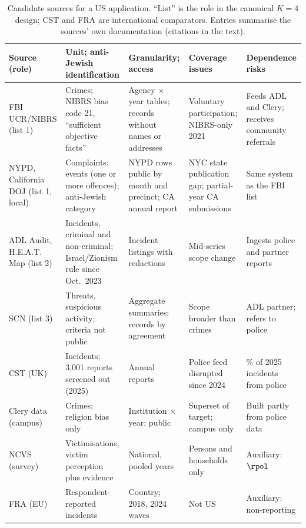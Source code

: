 \begin{table}[tbp]
\centering
\caption{Candidate sources for a US application. ``List'' is the role in the canonical $K=4$ design; CST and FRA are international comparators. Entries summarise the sources' own documentation (citations in the text).}\label{tab:src-compare}
\footnotesize
\setlength{\tabcolsep}{3pt}
\renewcommand{\arraystretch}{1.1}
\begin{tabularx}{\textwidth}{@{}>{\raggedright\arraybackslash}p{1.75cm}*{4}{>{\raggedright\arraybackslash}X}@{}}
\toprule
Source (role) & Unit; anti-Jewish identification & Granularity; access & Coverage issues & Dependence risks \\
\midrule
FBI UCR/\allowbreak NIBRS (list 1) & Crimes; NIBRS bias code 21, ``sufficient objective facts'' & Agency $\times$ year tables; records without names or addresses & Voluntary participation; NIBRS-only 2021 & Feeds ADL and Clery; receives community referrals \\
NYPD, California DOJ (list 1, local) & Complaints; events (one or more offences); anti-Jewish category & NYPD rows public by month and precinct; CA annual report & 2023 NYC state publication gap; partial-year CA submissions & Same system as the FBI list \\
ADL Audit, H.E.A.T. Map (list 2) & Incidents, criminal and non-criminal; Israel/Zionism rule since Oct.\ 2023 & Incident listings with redactions & Mid-series scope change & Ingests police and partner reports \\
SCN (list 3) & Threats, suspicious activity; criteria not public & Aggregate summaries; records by agreement & Scope broader than crimes & ADL partner; refers to police \\
CST (UK) & Incidents; 3{,}001 reports screened out (2025) & Annual reports & Police feed disrupted since 2024 & 16\% of 2025 incidents from police \\
Clery data (campus) & Crimes; religion bias only & Institution $\times$ year; public & Superset of target; campus only & Built partly from police data \\
NCVS (survey) & Victimisations; victim perception plus evidence & National, pooled years & Persons and households only & Auxiliary: $\rpol$ \\
FRA (EU) & Respondent-reported incidents & Country; 2018, 2024 waves & Not US & Auxiliary: non-reporting \\
\bottomrule
\end{tabularx}
\end{table}

